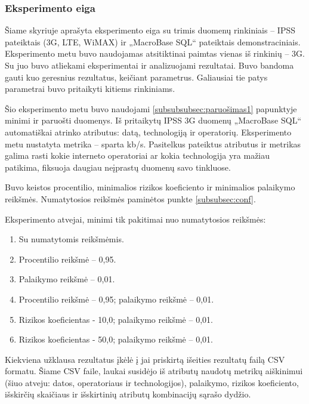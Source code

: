 \documentclass{VUMIFPSbakalaurinis}
\begin{document}
\subsubsection{Eksperimento eiga}
Šiame skyriuje aprašyta eksperimento eiga su trimis duomenų rinkiniais – IPSS pateiktais (3G, LTE, WiMAX) ir „MacroBase SQL“ pateiktais demonstraciniais. Eksperimento metu buvo naudojamas atsitiktinai paimtas vienas iš rinkinių – 3G. Su juo buvo atliekami eksperimentai ir analizuojami rezultatai. Buvo bandoma gauti kuo geresnius rezultatus, keičiant parametrus. Galiausiai tie patys parametrai buvo pritaikyti kitiems rinkiniams.

 \label{subsubsubsec:exp1}
Šio eksperimento metu buvo naudojami \ref{subsubsubsec:paruošimas1} papunktyje minimi ir paruošti duomenys. Iš pritaikytų IPSS 3G duomenų „MacroBase SQL“ automatiškai atrinko atributus: datą, technologiją ir operatorių. Eksperimento metu nustatyta metrika – sparta kb/s. Pasitelkus pateiktus atributus ir metrikas galima rasti kokie interneto operatoriai ar kokia technologija yra mažiau patikima, fiksuoja daugiau neįprastų duomenų savo tinkluose.\par

Buvo keistos procentilio, minimalios rizikos koeficiento ir minimalios palaikymo reikšmės. Numatytosios reikšmės paminėtos punkte \ref{subsubsec:conf}.\par

Eksperimento atvejai, minimi tik pakitimai nuo numatytosios reikšmės:
\begin{enumerate}
	\item Su numatytomis reikšmėmis.
	\item Procentilio reikšmė – 0,95.
	\item Palaikymo reikšmė – 0,01.
	\item Procentilio reikšmė – 0,95; palaikymo reikšmė – 0,01.
	\item Rizikos koeficientas - 10,0; palaikymo reikšmė – 0,01.
	\item Rizikos koeficientas - 50,0; palaikymo reikšmė – 0,01.
\end{enumerate}

Kiekviena užklausa rezultatus įkėlė į jai priskirtą išeities rezultatų failą CSV formatu. Šiame CSV faile, laukai susidėjo iš atributų naudotų metrikų aiškinimui (šiuo atveju: datos, operatoriaus ir technologijos), palaikymo, rizikos koeficiento, išskirčių skaičiaus ir išskirtinių atributų kombinacijų sąrašo dydžio.
\end{document}
